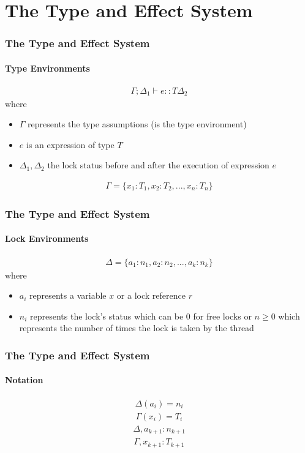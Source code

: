 \section{The Type and Effect System}

\begin{frame}
\frametitle{The Type and Effect System}
\framesubtitle{Type Environments}
\begin{align}
    \Gamma; \Delta_1 \vdash e :: T \Delta_2
\end{align}
where
\begin{itemize}
    \item $\Gamma$ represents the type assumptions (is the type environment)
    \item $e$ is an expression of type $T$
    \item $\Delta_1, \Delta_2$ the lock status before and after the execution of expression $e$
\end{itemize}
\begin{align}
    \tag{Type Environment}
    \Gamma = \{x_1:T_1, x_2:T_2, ..., x_n:T_n\}
\end{align}
\end{frame}

\begin{frame}
\frametitle{The Type and Effect System}
\framesubtitle{Lock Environments}
\begin{align}
    \tag{Lock Environment}
    \Delta = \{a_1:n_1, a_2:n_2, ..., a_k:n_k\}
\end{align}
where
\begin{itemize}
    \item \textbf{$a_i$} represents a variable $x$ or a lock reference $r$
    \item \textbf{$n_i$} represents the lock's status which can be 0 for free locks or $n \ge 0$ which represents the number of times the lock is taken by the thread
\end{itemize}
\end{frame}


\begin{frame}
\frametitle{The Type and Effect System}
\framesubtitle{Notation}
\begin{align}
    \tag{Lock Environment Look-up}
    \Delta(a_i) = n_i
\end{align}
\begin{align}
    \tag{Type Environment Look-up}
    \Gamma(x_i) = T_i
\end{align}
\begin{align}
    \tag{Extending Lock Environment}
    \Delta, a_{k+1}:n_{k+1}
\end{align}
\begin{align}
    \tag{Extending Type Environment}
    \Gamma, x_{k+1}:T_{k+1}
\end{align}
\end{frame}


